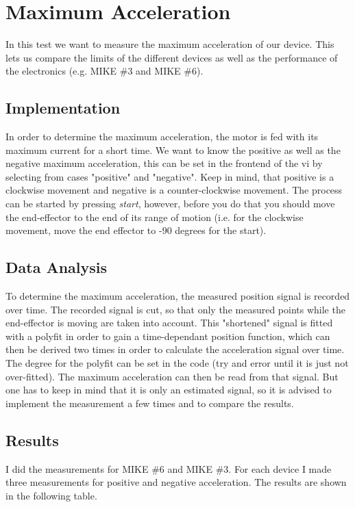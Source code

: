 \section{Maximum Acceleration}

In this test we want to measure the maximum acceleration of our device. This lets us compare the limits of the different devices as well as the performance of the electronics (e.g. MIKE \#3 and MIKE \#6).

\subsection{Implementation}

In order to determine the maximum acceleration, the motor is fed with its maximum current for a short time. We want to know the positive as well as the negative maximum acceleration, this can be set in the frontend of the vi by selecting from cases "positive" and "negative". Keep in mind, that positive is a clockwise movement and negative is a counter-clockwise movement. The process can be started by pressing \emph{start}, however, before you do that you should move the end-effector to the end of its range of motion (i.e. for the clockwise movement, move the end effector to -90 degrees for the start).

\subsection{Data Analysis}

To determine the maximum acceleration, the measured position signal is recorded over time. The recorded signal is cut, so that only the measured points while the end-effector is moving are taken into account. This "shortened" signal is fitted with a polyfit in order to gain a time-dependant position function, which can then be derived two times in order to calculate the acceleration signal over time. The degree for the polyfit can be set in the code (try and error until it is just not over-fitted). The maximum acceleration can then be read from that signal. But one has to keep in mind that it is only an estimated signal, so it is advised to implement the measurement a few times and to compare the results.

\subsection{Results}

I did the measurements for MIKE \#6 and MIKE \#3. For each device I made three measurements for positive and negative acceleration. The results are shown in the following table.

